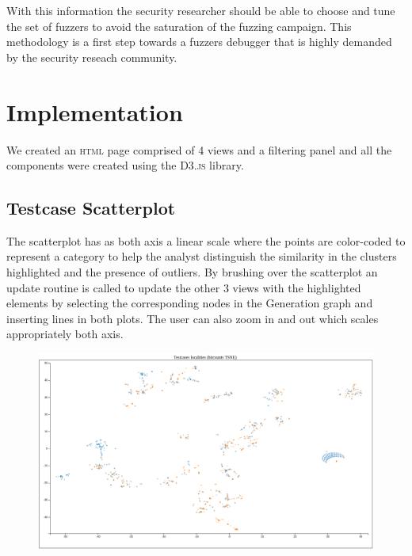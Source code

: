 \documentclass[conference,compsoc]{IEEEtran}
\begin{document}
With this information the security researcher should be able to choose and tune the set of fuzzers to avoid the saturation of the fuzzing campaign. This methodology is a first step towards a fuzzers debugger that is highly demanded by the security reseach community.


\section{Implementation}

We created an \textsc{html} page comprised of 4 views and a filtering panel and all the components were created using the \textsc{D3.js} library.
\subsection{Testcase Scatterplot}
 
The scatterplot has as both axis a linear scale where the points are color-coded to represent a category to help the analyst distinguish the similarity in the clusters highlighted and the presence of outliers.
By brushing over the scatterplot an update routine is called to update the other 3 views with the highlighted elements by selecting the corresponding nodes in the Generation graph and inserting lines in both plots.
The user can also zoom in and out which scales appropriately both axis.
\begin{figure}[H]
  \includegraphics[scale=0.2]{img/scatterplot}
  \label{fig:scatterplot}
\end{figure}
\end{document}
